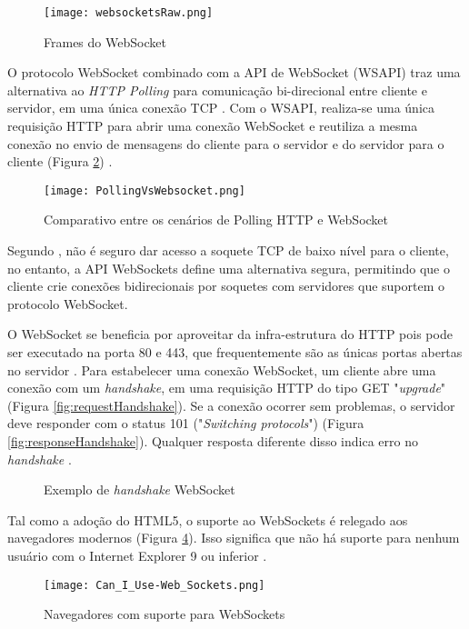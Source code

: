 \begin{figure}[H]
	\centering
	\caption{Frames do WebSocket}
	\texttt{[image: websocketsRaw.png]}
	\label{fig:websocketsRaw}
\end{figure}

O protocolo WebSocket combinado com a API de WebSocket (WSAPI) traz uma alternativa ao \emph{HTTP Polling} para comunicação bi-direcional entre cliente e servidor, em uma única conexão TCP \cite{Saint-Andre2011}. Com o WSAPI, realiza-se uma única requisição HTTP para abrir uma conexão WebSocket  e reutiliza a mesma conexão no envio de mensagens do cliente para o servidor e do servidor para o cliente (Figura \ref{fig:pollingVSwebsocket}) \cite{Wang2013}.

\begin{figure}[H]
	\centering
	\caption{Comparativo entre os cenários de Polling HTTP e WebSocket}
	\texttt{[image: PollingVsWebsocket.png]}
	\label{fig:pollingVSwebsocket}
\end{figure}

Segundo , não é seguro dar acesso a soquete TCP de baixo nível para o cliente, no entanto, a API WebSockets define uma alternativa segura, permitindo que o cliente crie conexões bidirecionais por soquetes com servidores que suportem o protocolo WebSocket.

O WebSocket se beneficia por aproveitar da infra-estrutura do HTTP pois pode ser executado na porta 80 e 443, que frequentemente são as únicas portas abertas no servidor \cite{grigorik2013high}. Para estabelecer uma conexão WebSocket, um cliente abre uma conexão com um \emph{handshake}, em uma requisição HTTP do tipo GET "\emph{upgrade}" (Figura \ref{fig:requestHandshake}). Se a conexão ocorrer sem problemas, o servidor deve responder com o status 101 ("\emph{Switching protocols}") (Figura \ref{fig:responseHandshake}). Qualquer resposta diferente disso indica erro no \emph{handshake} \cite{Saint-Andre2011}.

\begin{figure}[H]
	\centering
	\caption{Exemplo de \emph{handshake} WebSocket}
	\hfill
	\label{fig:handshakeWebsocket}
\end{figure}

Tal como a adoção do HTML5, o suporte ao WebSockets é relegado aos navegadores modernos (Figura \ref{fig:websocket}). Isso significa que não há suporte para nenhum usuário com o Internet Explorer 9 ou inferior \cite{lombardi2015websocket}.

\begin{figure}[H]
	\centering
	\caption{Navegadores com suporte para WebSockets}
	\texttt{[image: Can\_I\_Use-Web\_Sockets.png]}
	\label{fig:websocket}
\end{figure}
